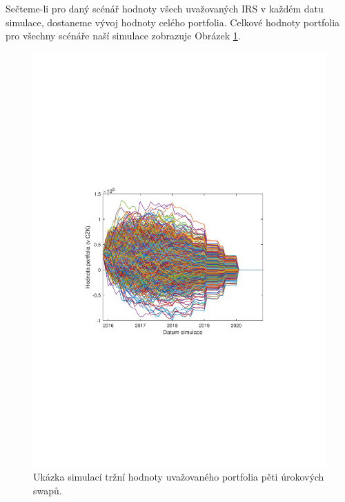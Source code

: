 \documentclass[a4paper,12pt]{report}
\theoremstyle{definition} \newtheorem{definice}[veta]{Definice}
\theoremstyle{remark}
\begin{document}
Sečteme-li pro daný scénář hodnoty všech uvažovaných IRS v každém datu simulace, dostaneme vývoj hodnoty celého portfolia.
Celkové hodnoty portfolia pro všechny scénáře naší simulace zobrazuje Obrázek \ref{TotalPortfoioValue}.
\begin{figure}[!htbp]
  \centering 
	\includegraphics[width=13cm, clip, trim= 100 270 110 270]{IMG/Hodnota_portfolia.pdf}
  \caption{Ukázka simulací tržní hodnoty uvažovaného portfolia pěti úrokových swapů.}  \label{TotalPortfoioValue}
\end{figure}
\end{document}
